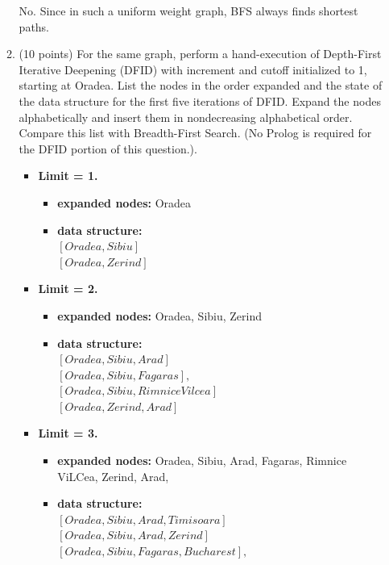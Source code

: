 \documentclass{article}%
\begin{document}
\begin{enumerate}
\begin{enumerate}
	No. Since in such a uniform weight graph, BFS always finds shortest paths.
	
	\item (10 points) For the same graph, perform a hand-execution of Depth-First Iterative Deepening (DFID) with increment and cutoff initialized to 1, starting at Oradea. List the nodes in the order expanded and the state of the data structure for the first five iterations of DFID. Expand the nodes alphabetically and insert them in nondecreasing alphabetical order. Compare this list with Breadth-First Search. (No Prolog is required for the DFID portion of this question.).\\
		
		\begin{itemize}
		\item \textbf{Limit = 1.} 
			\begin{itemize}
			\item \textbf{expanded nodes:} Oradea
			\item \textbf{data structure:} \\
			$\left[ Oradea , Sibiu \right]$\\
			$\left[ Oradea, Zerind\right]$ 
			\end{itemize}
		\item \textbf{Limit = 2.} 
			\begin{itemize}
			\item \textbf{expanded nodes:} Oradea, Sibiu, Zerind
			\item \textbf{data structure:} \\
			$\left[ Oradea, Sibiu, Arad \right]$\\
			$ \left[ Oradea, Sibiu, Fagaras \right],$ \\ 
			$ \left[ Oradea, Sibiu, Rimnice Vilcea \right]$\\ 
			$\left[ Oradea, Zerind, Arad\right] $ 
			\end{itemize}
		\item \textbf{Limit = 3.} 
			\begin{itemize}
			\item \textbf{expanded nodes:} Oradea, Sibiu, Arad, Fagaras, Rimnice ViLCea, Zerind, Arad, 
			\item \textbf{data structure:} \\
			$\left[ Oradea, Sibiu, Arad,Timisoara \right]$ \\ 
			$\left[ Oradea, Sibiu, Arad,Zerind \right]$ \\ 
			$ \left[ Oradea, Sibiu, Fagaras, Bucharest \right],$ \\ 

\end{itemize}
\end{itemize}
\end{enumerate}
\end{enumerate}
\end{document}

